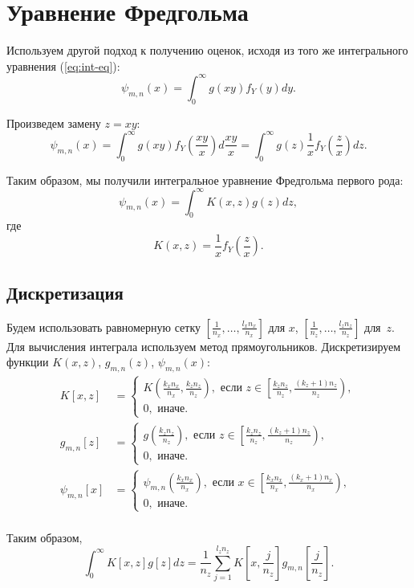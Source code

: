 \documentclass[../paper.tex]{subfiles}
\begin{document}
\section{Уравнение Фредгольма}
Используем другой подход к получению оценок, исходя из того же интегрального уравнения (\ref{eq:int-eq}):
\[
	\psi_{m,n}(x) = \int_{0}^{\infty} g(xy) f_Y(y) dy  
.\]

Произведем замену $z = xy$:
\[
	\psi_{m,n}(x) = \int_{0}^{\infty}  g(xy) f_Y\left(\frac{xy}{x}\right) d\frac{xy}{x}
	= \int_{0}^{\infty} g(z) \frac{1}{x} f_Y\left(\frac{z}{x}\right) dz  
.\]

Таким образом, мы получили интегральное уравнение Фредгольма первого рода:
\[
	\psi_{m,n}(x) = \int_{0}^{\infty} K(x, z) g(z) dz 
,\]
где
\[
	K(x, z) = \frac{1}{x} f_Y \left(\frac{z}{x}\right)
.\]

\subsection{Дискретизация}
Будем использовать равномерную сетку $\left[\frac{1}{n_x}, \dots, \frac{l_x n_x}{n_x}\right]$ для $x$, $\left[\frac{1}{n_z}, \dots, \frac{l_z n_z}{n_z}\right]$ для~$z$.
Для вычисления интеграла используем метод прямоугольников.
Дискретизируем функции $K(x,z)$, $g_{m,n}(z)$, $\psi_{m,n}(x)$:
\begin{align*}
	K[x,z] 
	&=
	\begin{cases}
		K\left(\frac{k_x n_x}{n_x}, \frac{k_z n_z}{n_z} \right), \text{ если } 
			z \in \left[\frac{k_z n_z}{n_z}, \frac{(k_z+1)n_z}{n_z}\right),\\
		0, \text{ иначе.}
	\end{cases}\\
	g_{m,n}[z]
	&=
	\begin{cases}
		g\left(\frac{k_z n_z}{n_z}\right), \text{ если } z \in \left[\frac{k_z n_z}{n_z}, \frac{(k_z+1)n_z}{n_z}\right),\\
		0, \text{ иначе.}
	\end{cases}\\
	\psi_{m,n}[x]
	&=
	\begin{cases}
		\psi_{m,n}\left(\frac{k_x n_x}{n_x}\right), \text{ если } x \in \left[\frac{k_x n_x}{n_x}, \frac{(k_x+1)n_x}{n_x}\right),\\
		0, \text{ иначе.}
	\end{cases}\\
\end{align*}

Таким образом,
\[
	\int_{0}^{\infty} K[x,z] g[z] dz
	= \frac{1}{n_z} \sum_{j=1}^{l_z n_z} K\left[x, \frac{j}{n_z}\right] g_{m,n}\left[\frac{j}{n_z}\right] 
.\]
\end{document}
